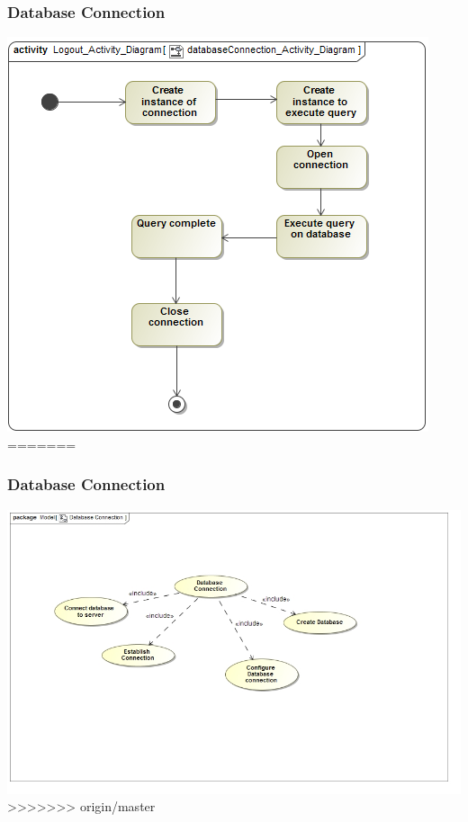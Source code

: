 \documentclass[11pt]{article}
\begin{document}
\subsubsection{Database Connection}
\begin{center} 
	\includegraphics[width=\textwidth]{../Images/databaseConnection_Activity_Diagram.png}\\[0.5cm]
=======
\subsubsection{Database Connection}
\begin{center} 
	\includegraphics[width=\textwidth]{../Images/DatabaseConnectionUC.jpg}\\[0.5cm]
>>>>>>> origin/master
\end{center}

\end{center}
\end{document}

